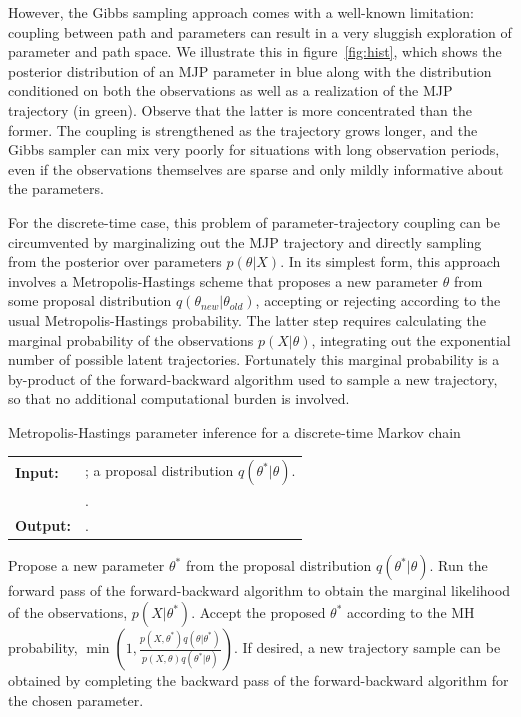   However, the Gibbs sampling approach %
  comes with a well-known limitation:
coupling between path and parameters can result in a very sluggish
exploration of parameter and path space. We illustrate this in figure~\ref{fig:hist},
which shows the posterior distribution of an MJP parameter in blue
along with the distribution conditioned on both the observations 
as well as a realization of the MJP trajectory (in green). 
Observe that the latter is more concentrated than the former. The
coupling is strengthened as the trajectory grows longer, and
the Gibbs sampler can mix very poorly for situations with
long observation periods, even if the observations themselves are
sparse and only mildly informative about the parameters.

For the discrete-time case, this problem of parameter-trajectory
coupling can be circumvented by marginalizing out the MJP trajectory 
and directly sampling from the posterior over parameters $p(\theta|X)$.
In its simplest form, this approach involves a Metropolis-Hastings
scheme that proposes a new parameter $\theta$ from some proposal distribution 
$q(\theta_{new}|\theta_{old})$, accepting or rejecting according to the usual
Metropolis-Hastings probability. The latter step requires calculating the 
marginal probability of the observations $p(X|\theta)$, integrating out
the exponential number of possible latent trajectories. Fortunately
this marginal probability is a by-product of the forward-backward
algorithm used to sample a new trajectory, so that no 
additional computational burden is involved. 

\begin{algorithm}[H]
  \caption{Metropolis-Hastings parameter inference for a discrete-time 
Markov chain}
   \label{alg:disc_time_mh}
  \begin{tabular}{l l}
   \textbf{Input:  } & \text{A set of observations $X$};
    a proposal distribution $q(\theta^*|\theta)$. \\
  & \text{The previous Markov chain parameters $\theta$}.\\
  \textbf{Output:  }& \text{A new Markov chain parameter $\theta^*$}.\\
   \hline
   \end{tabular}
   \begin{algorithmic}[1]
  \State Propose a new parameter $\theta^*$ from the proposal distribution
    $q(\theta^*|\theta)$.
  \State Run the forward pass of the forward-backward algorithm to 
    obtain the marginal likelihood of the observations, $p(X|\theta^*)$.
  \State Accept the proposed $\theta^*$ according to the MH probability, 
    $\min(1,\frac{p(X,\theta^*)q(\theta|\theta^*)}{p(X,\theta)q(\theta^*|\theta)})$.
  \State If desired, a new trajectory sample can be obtained by
    completing the backward pass of the forward-backward algorithm for the chosen
    parameter.
\end{algorithmic}
\end{algorithm}

